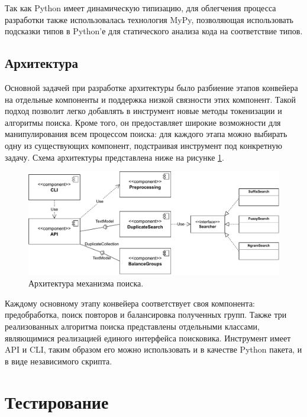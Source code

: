 \documentclass[14pt]{matmex-diploma-custom}
\begin{document}
Так как Python имеет динамическую типизацию, для облегчения процесса разработки также использовалась технология MyPy, позволяющая использовать подсказки типов в Python'е для статического анализа кода на соответствие типов.

\subsection{Архитектура}

Основной задачей при разработке архитектуры было разбиение этапов конвейера на отдельные компоненты и поддержка низкой связности этих компонент. Такой подход позволит легко добавлять в инструмент новые методы токенизации и алгоритмы поиска. Кроме того, он предоставляет широкие возможности для манипулирования всем процессом поиска: для каждого этапа можно выбирать одну из существующих компонент, подстраивая инструмент под конкретную задачу. Схема архитектуры представлена ниже на рисунке \ref{fig:Architecture}.

\begin{figure}[h!]
	\centering
	\includegraphics[scale=0.7]{pictures/Architecture.pdf}
	\caption{Архитектура механизма поиска.}
	\label{fig:Architecture}
\end{figure}

Каждому основному этапу конвейера соответствует своя компонента: предобработка, поиск повторов и балансировка полученных групп. Также три реализованных алгоритма поиска представлены отдельными классами, являющимися реализацией единого интерфейса поисковика. Инструмент имеет API и CLI, таким образом его можно использовать и в качестве Python пакета, и в виде независимого скрипта.

\clearpage
\section{Тестирование}
\end{document}
